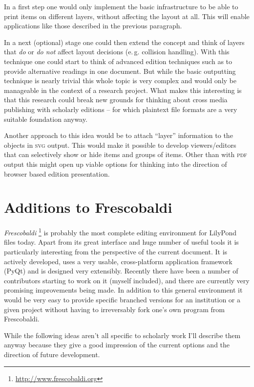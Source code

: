 \documentclass[oneside]{OLLbook}
\begin{document}
In a first step one would only implement the basic infrastructure to be able to print items on different layers, without affecting the layout at all.
This will enable applications like those described in the previous paragraph.

In a next (optional) stage one could then extend the concept and think of layers that \emph{do} or \emph{do not} affect layout decisions (e.\,g. collision handling).
With this technique one could start to think of advanced edition techniques such as to provide alternative readings in one document.
But while the basic outputting technique is nearly trivial this whole topic is very complex and would only be manageable in the context of a research project.
What makes this interesting is that this research could break new grounds for thinking about cross media publishing with scholarly editions -- for which plaintext
file formats are a very suitable foundation anyway.

\medskip
Another approach to this idea would be to attach “layer” information to the objects in \textsc{svg} output.
This would make it possible to develop viewers/editors that can selectively show or hide items and groups of items.
Other than with \textsc{pdf} output this might open up viable options for thinking into the direction of browser based edition presentation.

\chapter{Additions to Frescobaldi}\label{sec:additions-to-frescobaldi}
\emph{Frescobaldi}%
\footnote{\url{http://www.frescobaldi.org}}
is probably the most complete editing environment for LilyPond files today.
Apart from its great interface and huge number of useful tools it is particularly interesting from the perspective of the current document.
It is actively developed, uses a very usable, cross-platform application framework (PyQt) and is designed very extensibly.
Recently there have been a number of contributors starting to work on it (myself included), and there are currently very promising improvements being made.
In addition to this general environment it would be very easy to provide specific branched versions for an institution or a given project without having to irreversably fork one's own program from Frescobaldi.

While the following ideas aren't all specific to scholarly work I'll describe them anyway because they give a good impression of the current options and the direction of future development.
\end{document}

